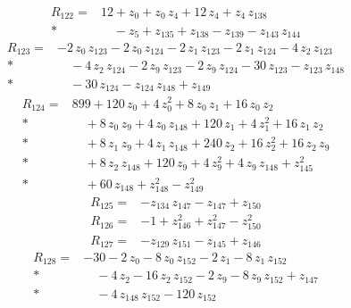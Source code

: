 \documentclass[10pt]{article}
\begin{document}
\begin{align*}
R_{122}={}& 12 + z_{0} + z_{0}\,z_{4} + 12\,z_{4} + z_{4}\,z_{138} \\*
&\quad - z_{5} + z_{135} + z_{138} - z_{139} - z_{143}\,z_{144}
\end{align*}
\begin{align*}
R_{123}={}& - 2\,z_{0}\,z_{123} - 2\,z_{0}\,z_{124} - 2\,z_{1}\,z_{123} - 2\,z_{1}\,z_{124} - 4\,z_{2}\,z_{123} \\*
&\quad - 4\,z_{2}\,z_{124} - 2\,z_{9}\,z_{123} - 2\,z_{9}\,z_{124} - 30\,z_{123} - z_{123}\,z_{148} \\*
&\quad - 30\,z_{124} - z_{124}\,z_{148} + z_{149}
\end{align*}
\begin{align*}
R_{124}={}& 899 + 120\,z_{0} + 4\,z_{0}^{2} + 8\,z_{0}\,z_{1} + 16\,z_{0}\,z_{2} \\*
&\quad + 8\,z_{0}\,z_{9} + 4\,z_{0}\,z_{148} + 120\,z_{1} + 4\,z_{1}^{2} + 16\,z_{1}\,z_{2} \\*
&\quad + 8\,z_{1}\,z_{9} + 4\,z_{1}\,z_{148} + 240\,z_{2} + 16\,z_{2}^{2} + 16\,z_{2}\,z_{9} \\*
&\quad + 8\,z_{2}\,z_{148} + 120\,z_{9} + 4\,z_{9}^{2} + 4\,z_{9}\,z_{148} + z_{145}^{2} \\*
&\quad + 60\,z_{148} + z_{148}^{2} - z_{149}^{2}
\end{align*}
\begin{align*}
R_{125}={}& - z_{134}\,z_{147} - z_{147} + z_{150}
\end{align*}
\begin{align*}
R_{126}={}& - 1 + z_{146}^{2} + z_{147}^{2} - z_{150}^{2}
\end{align*}
\begin{align*}
R_{127}={}& - z_{129}\,z_{151} - z_{145} + z_{146}
\end{align*}
\begin{align*}
R_{128}={}& - 30 - 2\,z_{0} - 8\,z_{0}\,z_{152} - 2\,z_{1} - 8\,z_{1}\,z_{152} \\*
&\quad - 4\,z_{2} - 16\,z_{2}\,z_{152} - 2\,z_{9} - 8\,z_{9}\,z_{152} + z_{147} \\*
&\quad - 4\,z_{148}\,z_{152} - 120\,z_{152}
\end{align*}
\end{document}
